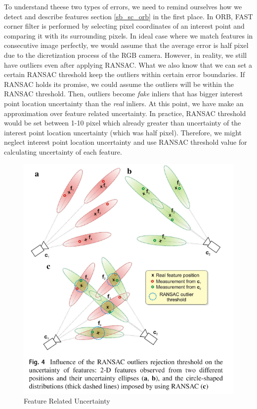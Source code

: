 \documentclass[a4paper]{report}
\numberwithin{figure}{section}
\begin{document}
To understand theese two types of errors, we need to remind ourselves 
how we detect and describe features section \ref{sb_sc_orb} in the first place. 
In ORB, FAST corner filter is performed by selecting pixel coordinates of an 
interest point and comparing it with its surrounding pixels. In ideal case 
where we match features in consecutive image perfectly, we would assume that 
the average error is half pixel due to the dicretization process of the RGB camera. 
However, in reality, we still have outliers even after applying RANSAC. 
What we also know that we can set a certain RANSAC threshold keep the outliers 
within certain error boundaries. If RANSAC holds its promise, we could 
assume the outliers will be within the RANSAC threshold. Then, outliers 
become \textit{fake} inliers that has bigger interest point location uncertainty than 
the \textit{real} inliers. At this point, we have make an approximation over 
feature related uncertainty. In practice, RANSAC threshold would be set 
between 1-10 pixel which already greater than uncertainty of the interest point 
location uncertainty (which was half pixel). Therefore, we might neglect 
interest point location uncertainty and use RANSAC threshold value for 
calculating uncertainty of each feature.

\begin{figure}[H]
	\centering
  \includegraphics[width=0.7\linewidth,natwidth=640,natheight=640]
  {fig/ref_imgs/feature_related_uncertainty.png}
  \caption{Feature Related Uncertainty}
	\label{fig:feature_related_uncertainty}
\end{figure}
\end{document}

